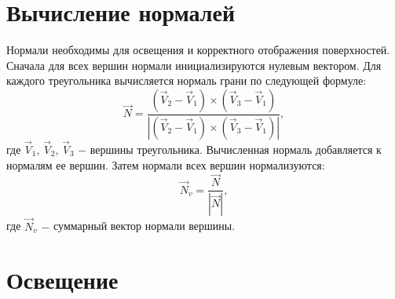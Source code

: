 
\section{Вычисление нормалей}

Нормали необходимы для освещения и корректного отображения поверхностей. Сначала для всех вершин нормали инициализируются нулевым вектором. Для каждого треугольника вычисляется нормаль грани по следующей формуле:
\begin{equation}
    \vec{N} = \frac{(\vec{V}_2 - \vec{V}_1) \times (\vec{V}_3 - \vec{V}_1)}{|(\vec{V}_2 - \vec{V}_1) \times (\vec{V}_3 - \vec{V}_1)|},
\end{equation}
где $\vec{V}_1$, $\vec{V}_2$, $\vec{V}_3$ $-$ вершины треугольника. Вычисленная нормаль добавляется к нормалям ее вершин. Затем нормали всех вершин нормализуются:
\begin{equation}
    \vec{N}_v = \frac{\vec{N}}{|\vec{N}|},
\end{equation}
где $\vec{N}_v$ $-$ суммарный вектор нормали вершины.

\section{Освещение}

